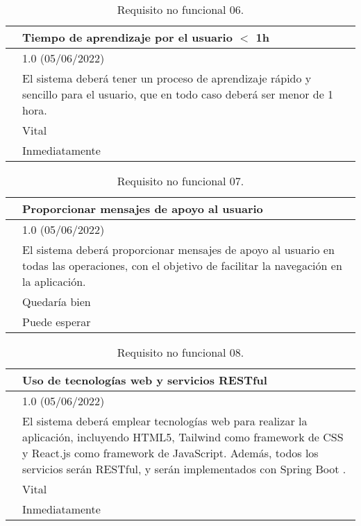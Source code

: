 \begin{table}[H]
\begin{center}
\begin{tabular}{|p{3cm}|p{10cm}|} \hline
\centering {\bf NFR-06} & Tiempo de aprendizaje por el usuario $<$ 1h  \\ \hline\hline
\centering {\bf Versión} & 1.0 (05/06/2022) \\ \hline
\centering {\bf Descripción} & El sistema deberá tener un proceso de aprendizaje rápido y sencillo para el usuario, que en todo caso deberá ser menor de 1 hora. \\ \hline
\centering {\bf Importancia} & Vital \\ \hline
\centering {\bf Urgencia} & Inmediatamente \\ \hline
\end{tabular}
\caption{Requisito no funcional 06.}
\label{enlaceNFR6}
\end{center}
\end{table}

\begin{table}[H]
\begin{center}
\begin{tabular}{|p{3cm}|p{10cm}|} \hline
\centering {\bf NFR-07} & Proporcionar mensajes de apoyo al usuario  \\ \hline\hline
\centering {\bf Versión} & 1.0 (05/06/2022) \\ \hline
\centering {\bf Descripción} & El sistema deberá proporcionar mensajes de apoyo al usuario en todas las operaciones, con el objetivo de facilitar la navegación en la aplicación. \\ \hline
\centering {\bf Importancia} & Quedaría bien \\ \hline
\centering {\bf Urgencia} & Puede esperar \\ \hline
\end{tabular}
\caption{Requisito no funcional 07.}
\label{enlaceNFR7}
\end{center}
\end{table}

\begin{table}[H]
\begin{center}
\begin{tabular}{|p{3cm}|p{10cm}|} \hline
\centering {\bf NFR-08} & Uso de tecnologías web y servicios RESTful  \\ \hline\hline
\centering {\bf Versión} & 1.0 (05/06/2022) \\ \hline
\centering {\bf Descripción} & El sistema deberá emplear tecnologías web para realizar la aplicación, incluyendo HTML5, Tailwind \cite{tailwind} como framework de CSS y React.js \cite{react} como framework de JavaScript. Además, todos los servicios serán RESTful, y serán implementados con Spring Boot \cite{spring}. \\ \hline
\centering {\bf Importancia} & Vital \\ \hline
\centering {\bf Urgencia} & Inmediatamente \\ \hline
\end{tabular}
\caption{Requisito no funcional 08.}
\label{enlaceNFR8}
\end{center}
\end{table}

